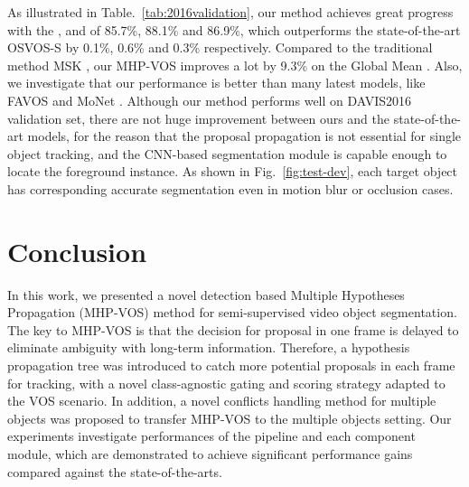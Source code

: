 \documentclass[10pt,twocolumn,letterpaper]{article}
\begin{document}
As illustrated in Table.~\ref{tab:2016validation}, our method achieves great progress with the ,  and  of 85.7\%, 88.1\% and 86.9\%, which outperforms the state-of-the-art OSVOS-S \cite{Man+18b} by 0.1\%, 0.6\% and 0.3\% respectively. Compared to the traditional method  MSK \cite{perazzi2017learning}, our MHP-VOS improves a lot by 9.3\% on the Global Mean . Also, we investigate that our performance is better than many latest models, like FAVOS \cite{cheng2018fast} and MoNet \cite{xiao2018monet}. Although our method performs well on DAVIS2016 validation set, there are not huge improvement between ours and the state-of-the-art models, for the reason that the proposal propagation is not essential for single object tracking, and the CNN-based segmentation module is capable enough to locate the foreground instance. 
As shown in Fig.~\ref{fig:test-dev}, each target object has corresponding accurate segmentation even in motion blur or occlusion cases.

\vspace{-6pt}
\section{Conclusion} 
\vspace{-6pt}
In this work, we presented a novel detection based Multiple Hypotheses Propagation (MHP-VOS) method for semi-supervised video object segmentation. The key to MHP-VOS is that the decision for proposal in one frame is delayed to eliminate ambiguity with long-term information. Therefore, a hypothesis propagation tree was introduced to catch more potential proposals in each frame for tracking, with a novel class-agnostic gating and scoring strategy adapted to the VOS scenario. In addition, a novel conflicts handling method for multiple objects was proposed to transfer MHP-VOS to the multiple objects setting. Our experiments investigate performances of the pipeline and each component module, which are demonstrated to achieve significant performance gains compared against the state-of-the-arts.


{\small


}
\end{document}
